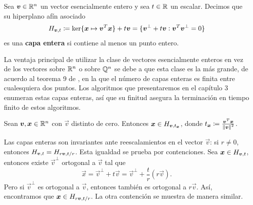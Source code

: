 
\begin{definition}
	\label{phase-1:def:c-layer}
	Sea $\boldsymbol{v} \in \mathbb{R}^n$ un vector esencialmente entero y sea $t \in \mathbb{R}$ un escalar. Decimos que
	su hiperplano afín asociado
	\begin{equation}
		\label{phase-1:def:affine-hyperplane}
		H_{\boldsymbol{v}, t} \coloneq \operatorname{ker}\lbrace \boldsymbol{x} \mapsto \boldsymbol{v}^T\boldsymbol{x} \rbrace + t\boldsymbol{v}
		= \lbrace \boldsymbol{v}^{\perp} + t\boldsymbol{v} \vcentcolon \boldsymbol{v}^T\boldsymbol{v}^{\perp} = 0 \rbrace
	\end{equation}
	es una \textbf{capa entera} si contiene al menos un punto entero.
\end{definition}

La ventaja principal de utilizar la clase de vectores esencialmente enteros en vez de los vectores
sobre $\mathbb{R}^n$ o sobre $\mathbb{Q}^n$ se debe a que esta clase es la más grande, de acuerdo al teorema 9 de
\cite{herr}, en la que el número de capas enteras es finita entre cualesquiera dos puntos. Los
algoritmos que presentaremos en el capítulo 3 enumeran estas capas enteras, así que su finitud
asegura la terminación en tiempo finito de estos algoritmos.

\begin{lemma}
	\label{phase-1:lemma:layer}
	Sean $\boldsymbol{v}, \boldsymbol{x} \in \mathbb{R}^n$ con $\vec{v}$ distinto de cero. Entonces $\boldsymbol{x} \in
	H_{\boldsymbol{v}, t_{\boldsymbol{x}}}$, donde $t_{\boldsymbol{x}} \coloneq
	\frac{\boldsymbol{v}^T\boldsymbol{x}}{\left\lVert \boldsymbol{v} \right\rVert^2}$.
\end{lemma}

Las capas enteras son invariantes ante reescalamientos en el vector $\vec{v}$: si $r \neq 0$,
entonces $H_{\boldsymbol{v}, t} = H_{r\boldsymbol{v}, t/r}$. Esta igualdad se prueba por contenciones.
Sea $\boldsymbol{x} \in H_{\boldsymbol{v}, t}$, entonces existe $\vec{v}^\perp$ ortogonal a $\vec{v}$ tal que
\begin{equation*}
	\vec{x} = \vec{v}^\perp + t\vec{v} = \vec{v}^\perp + \frac{t}{r}(r\vec{v}).
\end{equation*}
Pero si $\vec{v}^\perp$ es ortogonal a $\vec{v}$, entonces también es ortogonal a $r\vec{v}$. Así,
encontramos que $\boldsymbol{x} \in H_{r\boldsymbol{v}, t/r}$. La otra contención se muestra de manera
similar.

